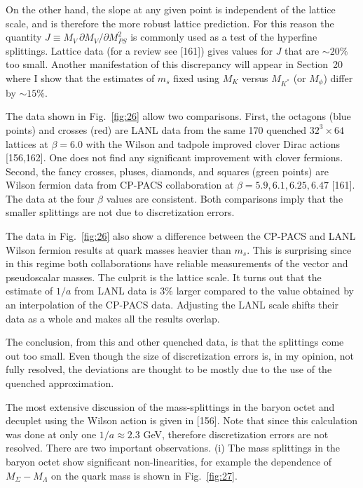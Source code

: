 On the other hand, the slope at any given point is independent of the lattice scale, and is therefore the more robust lattice prediction. For this reason the quantity $J \equiv M_V \, \partial M_V / \partial M_{PS}^2$ is commonly used as a test of the hyperfine splittings. Lattice data (for a review see [161]) gives values for $J$ that are $\sim 20\%$ too small. Another manifestation of this discrepancy will appear in Section~20 where I show that the estimates of $m_s$ fixed using $M_K$ versus $M_{K^*}$ (or $M_\phi$) differ by $\sim 15\%$.

The data shown in Fig.~\ref{fig:26} allow two comparisons. First, the octagons (blue points) and crosses (red) are LANL data from the same 170 quenched $32^3 \times 64$ lattices at $\beta = 6.0$ with the Wilson and tadpole improved clover Dirac actions [156,162]. One does not find any significant improvement with clover fermions. Second, the fancy crosses, pluses, diamonds, and squares (green points) are Wilson fermion data from CP-PACS collaboration at $\beta = 5.9, 6.1, 6.25, 6.47$ [161]. The data at the four $\beta$ values are consistent. Both comparisons imply that the smaller splittings are not due to discretization errors.

The data in Fig.~\ref{fig:26} also show a difference between the CP-PACS and LANL Wilson fermion results at quark masses heavier than $m_s$. This is surprising since in this regime both collaborations have reliable measurements of the vector and pseudoscalar masses. The culprit is the lattice scale. It turns out that the estimate of $1/a$ from LANL data is 3\% larger compared to the value obtained by an interpolation of the CP-PACS data. Adjusting the LANL scale shifts their data as a whole and makes all the results overlap.

The conclusion, from this and other quenched data, is that the splittings come out too small. Even though the size of discretization errors is, in my opinion, not fully resolved, the deviations are thought to be mostly due to the use of the quenched approximation.

The most extensive discussion of the mass-splittings in the baryon octet and decuplet using the Wilson action is given in [156]. Note that since this calculation was done at only one $1/a \approx 2.3$ GeV, therefore discretization errors are not resolved. There are two important observations. (i) The mass splittings in the baryon octet show significant non-linearities, for example the dependence of $M_\Sigma - M_\Lambda$ on the quark mass is shown in Fig.~\ref{fig:27}.

